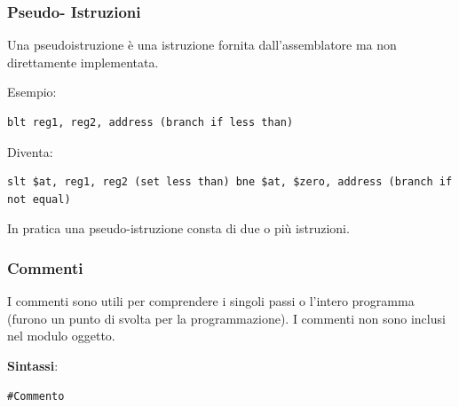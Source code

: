 \documentclass[12pt]{article}
\begin{document}
\subsubsection{Pseudo- Istruzioni}
Una pseudoistruzione è una istruzione fornita dall’assemblatore ma non direttamente implementata. \par\medskip\noindent Esempio: 
\begin{lstlisting}
blt reg1, reg2, address (branch if less than) 
\end{lstlisting}
\vspace{\baselineskip}
Diventa:
\begin{lstlisting}
slt $at, reg1, reg2 (set less than) bne $at, $zero, address (branch if not equal)
\end{lstlisting}
In pratica una pseudo-istruzione consta di due o più istruzioni.\par\medskip\noindent
\subsubsection{Commenti}
I commenti sono utili per comprendere i singoli passi o l’intero programma (furono un punto di svolta per la programmazione). I commenti non sono inclusi nel modulo oggetto.\par\medskip\noindent
\textbf{Sintassi}: \begin{lstlisting}
#Commento
\end{lstlisting}
\newpage
\end{document}
